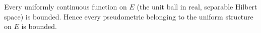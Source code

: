 Every uniformly continuous function on $E$ (the unit ball in real, separable Hilbert space) is bounded. Hence every pseudometric belonging to the uniform structure on $E$ is bounded.
